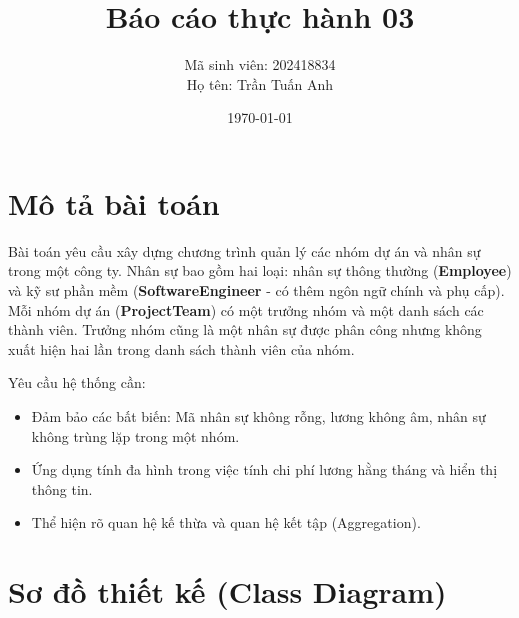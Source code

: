 \documentclass[12pt,a4paper]{article}
\title{\vspace*{2cm}\huge\textbf{Báo cáo thực hành 03}}
\author{\Large Mã sinh viên: 202418834 \\ \Large Họ tên: Trần Tuấn Anh}
\date{\today}
\begin{document}
\maketitle

\section{Mô tả bài toán}
Bài toán yêu cầu xây dựng chương trình quản lý các nhóm dự án và nhân sự trong một công ty. Nhân sự bao gồm hai loại: nhân sự thông thường (\textbf{Employee}) và kỹ sư phần mềm (\textbf{SoftwareEngineer} - có thêm ngôn ngữ chính và phụ cấp). Mỗi nhóm dự án (\textbf{ProjectTeam}) có một trưởng nhóm và một danh sách các thành viên. Trưởng nhóm cũng là một nhân sự được phân công nhưng không xuất hiện hai lần trong danh sách thành viên của nhóm. 

Yêu cầu hệ thống cần:
\begin{itemize}
    \item Đảm bảo các bất biến: Mã nhân sự không rỗng, lương không âm, nhân sự không trùng lặp trong một nhóm.
    \item Ứng dụng tính đa hình trong việc tính chi phí lương hằng tháng và hiển thị thông tin.
    \item Thể hiện rõ quan hệ kế thừa và quan hệ kết tập (Aggregation).
\end{itemize}

\newpage
\section{Sơ đồ thiết kế (Class Diagram)}
\end{document}
